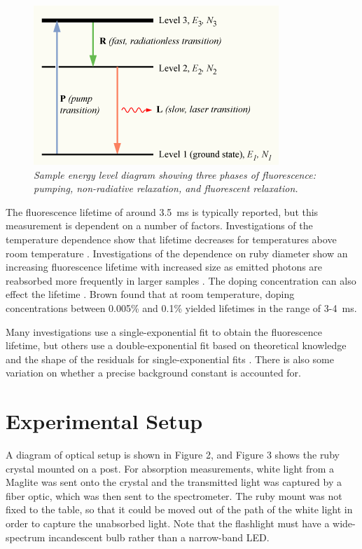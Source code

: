 \documentclass[11pt, a4paper, twocolumn]{article}
\begin{document}
\begin{figure}
\includegraphics[width=\linewidth]{Population-inversion-3level.png}
\caption{\textit{Sample energy level diagram showing three phases of fluorescence: pumping, non-radiative relaxation, and fluorescent relaxation.}}
\label{fig:populationInversion}
\end{figure}

The fluorescence lifetime of around \SI{3.5}{\ms} is typically reported, but this measurement is dependent on a number of factors. Investigations of the temperature dependence show that lifetime decreases for temperatures above room temperature \cite{Seat, Nelson}. Investigations of the dependence on ruby diameter show an increasing fluorescence lifetime with increased size as emitted photons are reabsorbed more frequently in larger samples \cite{Jones}. The doping concentration can also effect the lifetime \cite{Brown}. Brown found that at room temperature, doping concentrations between 0.005\% and 0.1\% yielded lifetimes in the range of 3-\SI{4}{\ms}.

Many investigations use a single-exponential fit to obtain the fluorescence lifetime, but others use a double-exponential fit based on theoretical knowledge and the shape of the residuals for single-exponential fits \cite{McBane, Jones}. There is also some variation on whether a precise background constant is accounted for.

\section*{Experimental Setup}

A diagram of optical setup is shown in Figure 2, and Figure 3 shows the ruby crystal mounted on a post. For absorption measurements, white light from a Maglite was sent onto the crystal and the transmitted light was captured by a fiber optic, which was then sent to the spectrometer. The ruby mount was not fixed to the table, so that it could be moved out of the path of the white light in order to capture the unabsorbed light. Note that the flashlight must have a wide-spectrum incandescent bulb rather than a narrow-band LED.
\end{document}
